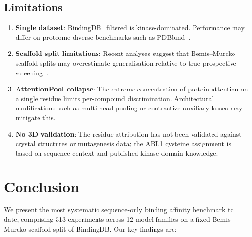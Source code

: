 \documentclass[11pt,twocolumn]{article}
\begin{document}
\subsection{Limitations}

\begin{enumerate}
  \item \textbf{Single dataset}: BindingDB\_filtered is kinase-dominated.
    Performance may differ on proteome-diverse benchmarks such as
    PDBbind~\cite{su2018comparative}.
  \item \textbf{Scaffold split limitations}: Recent analyses suggest that
    Bemis--Murcko scaffold splits may overestimate generalisation
    relative to true prospective screening~\cite{lim2019scaffold}.
  \item \textbf{AttentionPool collapse}: The extreme concentration of
    protein attention on a single residue limits per-compound
    discrimination.  Architectural modifications such as multi-head pooling
    or contrastive auxiliary losses may mitigate this.
  \item \textbf{No 3D validation}: The residue attribution has not been
    validated against crystal structures or mutagenesis data; the ABL1
    cysteine assignment is based on sequence context and published kinase
    domain knowledge.
\end{enumerate}

\section{Conclusion}

We present the most systematic sequence-only binding affinity benchmark to
date, comprising 313 experiments across 12 model families on a fixed
Bemis--Murcko scaffold split of BindingDB.  Our key findings are:
\end{document}
